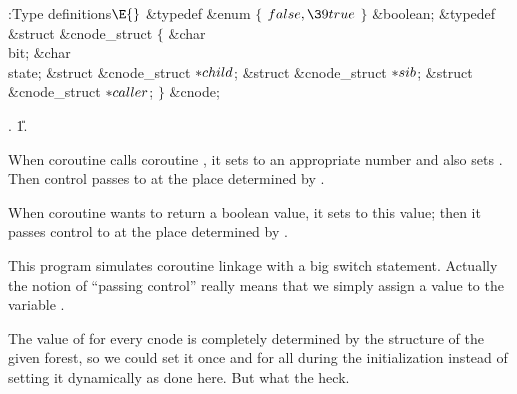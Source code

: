 \Y\B\4:Type definitions\X${}\E{}$\6
\&{typedef} \&{enum} ${}\{{}$\1\6
${}\\{false},\39\\{true}{}$\2\6
${}\}{}$ \&{boolean};\7
\&{typedef} \&{struct} \&{cnode\_struct} ${}\{{}$\1\6
\&{char} \\{bit};\6
\&{char} \\{state};\6
\&{struct} \&{cnode\_struct} ${}{*}\\{child}{}$;\6
\&{struct} \&{cnode\_struct} ${}{*}\\{sib}{}$;\6
\&{struct} \&{cnode\_struct} ${}{*}\\{caller}{}$;\2\6
${}\}{}$ \&{cnode};\par
{}.
\U1.\fi

When coroutine  calls coroutine , it sets  to an
appropriate number and also sets . Then control
passes
to  at the place determined by .

When coroutine  wants to return a boolean value, it sets  to this
value; then it passes control to  at the place
determined
by .

This program simulates coroutine linkage with a big switch statement.
Actually the notion of ``passing control'' really means that we simply
assign a value to the variable .

The value of  for every cnode  is completely
determined by the
structure of the given forest, so we could set it once and for all during
the initialization instead of setting it dynamically as done here.
But what the heck.

